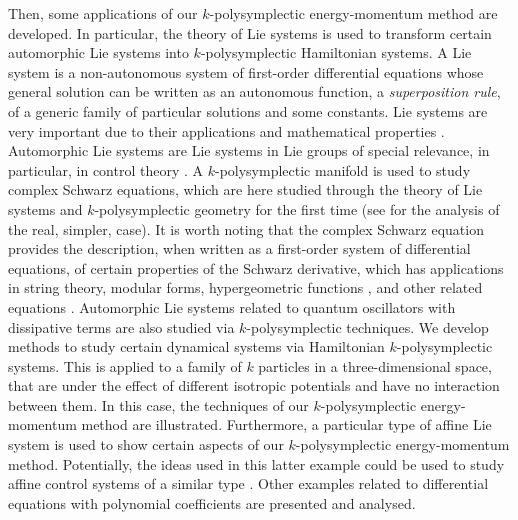 \documentclass[11pt]{article}
\theoremstyle{plain}
\theoremstyle{definition}
\numberwithin{equation}{section}
\begin{document}
Then, some applications of our $k$-polysymplectic energy-momentum method are developed. In particular, the theory of Lie systems is used to transform certain automorphic Lie systems \cite{CL_11,CGM_00,CGM_07,Win_83} into $k$-polysymplectic Hamiltonian systems. A Lie system is a non-autonomous system of first-order differential equations whose general solution can be written as an autonomous function, a {\it superposition rule}, of a generic family of particular solutions and some constants. Lie systems are very important due to their applications and mathematical properties \cite{CL_11,LS_20}.   Automorphic Lie systems are Lie systems in Lie groups of special relevance, in particular, in control theory \cite{CR_03}. 
A $k$-polysymplectic manifold is used to study complex Schwarz equations, which are here studied through the theory of Lie systems and $k$-polysymplectic geometry for the first time (see \cite{LS_20} for the analysis of the real, simpler, case). It is worth noting that the complex Schwarz equation provides the description, when written as a first-order system of differential equations, of certain properties of the Schwarz derivative, which has applications in string theory, modular forms, hypergeometric functions \cite{GR_07,Hil_97,Leh_79}, and other related equations \cite{BC_20}. Automorphic Lie systems related to quantum oscillators with dissipative terms are also studied via $k$-polysymplectic techniques. 
We develop methods to study certain dynamical systems via Hamiltonian $k$-polysymplectic systems. This is applied to a family of $k$ particles in a three-dimensional space, that are under the effect of different isotropic potentials and have no interaction between them. In this case, the techniques of our $k$-polysymplectic energy-momentum method are illustrated. Furthermore, a particular type of affine Lie system is used to show certain aspects of our $k$-polysymplectic energy-momentum method. Potentially, the ideas used in this latter example could be used to study affine control systems of a similar type \cite{CR_03}. Other examples related to differential equations with polynomial coefficients are presented and analysed.
\end{document}
